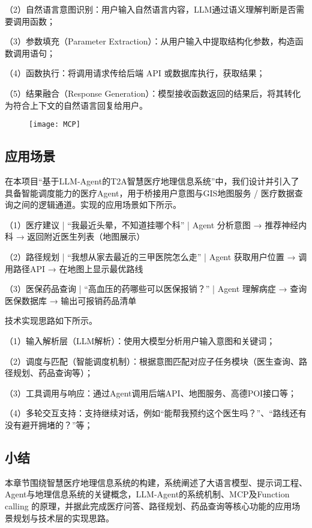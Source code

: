 \documentclass[fleqn,10pt]{IntroToAI} %
\begin{document}
（2）自然语言意图识别：用户输入自然语言内容，LLM通过语义理解判断是否需要调用函数；

（3）参数填充（Parameter Extraction）：从用户输入中提取结构化参数，构造函数调用语句；

（4）函数执行：将调用请求传给后端 API 或数据库执行，获取结果；

（5）结果融合（Response Generation）：模型接收函数返回的结果后，将其转化为符合上下文的自然语言回复给用户。

\begin{figure}
	\centering
	\texttt{[image: MCP]}
	\caption[MCP]{}
	\label{fig:mcp}
\end{figure}

\subsection{应用场景}

在本项目“基于LLM-Agent的T2A智慧医疗地理信息系统”中，我们设计并引入了具备智能调度能力的医疗Agent，用于桥接用户意图与GIS地图服务 / 医疗数据查询之间的逻辑通道。实现的应用场景如下所示。

（1）医疗建议 | “我最近头晕，不知道挂哪个科” | Agent 分析意图 → 推荐神经内科 → 返回附近医生列表（地图展示）

（2）路径规划 | “我想从家去最近的三甲医院怎么走” | Agent 获取用户位置 → 调用路径API → 在地图上显示最优路线

（3）医保药品查询 | “高血压的药哪些可以医保报销？” | Agent 理解病症 → 查询医保数据库 → 输出可报销药品清单

技术实现思路如下所示。

（1）输入解析层（LLM解析）：使用大模型分析用户输入意图和关键词；

（2）调度与匹配（智能调度机制）：根据意图匹配对应子任务模块（医生查询、路径规划、药品查询等）；

（3）工具调用与响应：通过Agent调用后端API、地图服务、高德POI接口等；

（4）多轮交互支持：支持继续对话，例如“能帮我预约这个医生吗？”、“路线还有没有避开拥堵的？”等；

\subsection{小结}
本章节围绕智慧医疗地理信息系统的构建，系统阐述了大语言模型、提示词工程、Agent与地理信息系统的关键概念，LLM-Agent的系统机制、MCP及Function calling 的原理，并据此完成医疗问答、路径规划、药品查询等核心功能的应用场景规划与技术层的实现思路。
\end{document}
